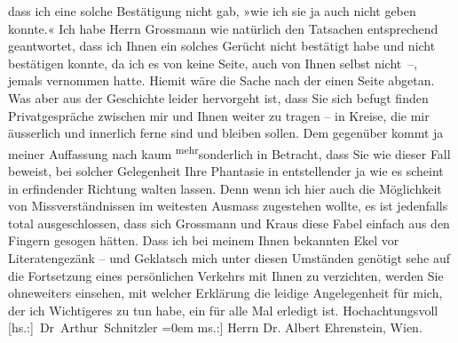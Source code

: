 \begin{ledgroupsized}[t]{13cm}
               dass ich eine solche Bestätigung nicht gab, \introOben{}»\introOben{}wie ich sie ja
               auch nicht geben konnte.\introOben{}«\introOben{}\pend
           \pstart
           Ich habe Herrn Grossmann wie natürlich den
               Tatsachen entsprechend geantwortet, dass ich Ihnen ein solches Gerücht nicht
               bestätigt habe und nicht bestätigen konnte, da ich es von keine Seite, auch von Ihnen
               selbst nicht –, jemals vernommen hatte. Hiemit wäre die Sache nach der einen Seite
               abgetan. Was aber aus der Geschichte leider hervorgeht ist, dass Sie sich befugt
               finden Privatge{\pb}spräche zwischen mir und Ihnen weiter zu tragen –
               in Kreise, die mir äusserlich und innerlich ferne sind und bleiben sollen. Dem
               gegenüber kommt ja meine\introOben{}r\introOben{} Auffassung \introOben{}nach\introOben{} kaum \substVorne{}\textsuperscript{mehr}\substDazwischen{}sonderlich\substHinten{} in Betracht, dass Sie wie dieser Fall beweist, bei solcher Gelegenheit Ihre
               Phantasie in entstellender ja wie es scheint in erfindender Richtung walten lassen.
               Denn wenn ich hier auch die Möglichkeit von Missverständnissen im weitesten Ausmass
               zugestehen wollte, es ist jedenfalls total ausgeschlossen, dass sich Grossmann und Kraus diese Fabel einfach aus den Fingern gesogen hätten. Dass ich bei
               meinem Ihnen bekannten Ekel vor Literatengezänk – und Geklatsch mich unter diesen
               Umständen genötigt sehe auf die Fortsetzung eines persönlichen Verkehrs mit Ihnen zu
               verzichten, werden Sie ohneweiters einsehen, mit welcher Erklärung die leidige
               Angelegenheit für mich, der ich Wichtigeres zu tun habe, ein für alle Mal erledigt
               ist.\pend
           \pstart
           Hochachtungsvoll{\\[\baselineskip]}\spacefill\mbox{{[}hs.:{]} Dr Arthur Schnitzler}\pend
           \leftskip=0em{}\pstart
           \noindent{}{[}ms.:{]} Herrn Dr. Albert Ehrenstein, Wien.\pend
           
         
         \endnumbering{}\end{ledgroupsized}  \newcommand{\dateiname}{L02008}\newcommand{\titel}{Arthur Schnitzler an Albert Ehrenstein, 9. 2. 1911}\newcommand{\editorInnen}{Martin Anton Müller und Gerd-Hermann Susen}
      